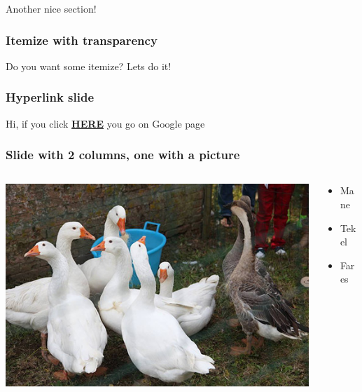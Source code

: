 \documentclass[xcolor=dvipsnames,aspectratio=169]{beamer}
\begin{document}
{\begin{section}{Another nice section!}
\begin{frame}[t]
\frametitle{Itemize with transparency}
Do you want some itemize? Lets do it!
\begin{itemize}
\end{itemize}
\end{frame}

\end{section}

\begin{frame}[t]
\frametitle{Hyperlink slide} 
Hi, if you click \textbf{\href{https://www.google.com}{HERE}} you go on Google page 
\end{frame}

\begin{frame}
\frametitle{Slide with 2 columns, one with a picture}

\begin{columns}

\begin{column}{0.4\textwidth}
\includegraphics[width=\columnwidth]{Immagini/duck.jpg}
\end{column}

\begin{column}{0.4\textwidth}
\begin{itemize}
\item Mane
\item Tekel
\item Fares
\end{itemize}
\end{column}


\end{columns}
\end{frame}}
\end{document}
